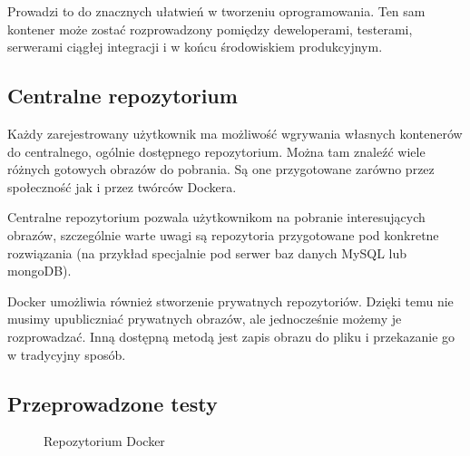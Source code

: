 \par{Prowadzi to do znacznych ułatwień w tworzeniu oprogramowania. Ten sam kontener może zostać rozprowadzony pomiędzy deweloperami, testerami, serwerami ciągłej integracji i w końcu środowiskiem produkcyjnym. }

\subsection[Centralne repozytorium]{Centralne repozytorium}

\par{Każdy zarejestrowany użytkownik ma możliwość wgrywania własnych kontenerów do centralnego, ogólnie dostępnego repozytorium. Można tam znaleźć wiele różnych gotowych obrazów do pobrania. Są one przygotowane zarówno przez społeczność jak i przez twórców Dockera. }

\par{Centralne repozytorium pozwala użytkownikom na pobranie interesujących obrazów, szczególnie warte uwagi są repozytoria przygotowane pod konkretne rozwiązania (na przykład specjalnie pod serwer baz danych MySQL lub mongoDB). }

\par{Docker umożliwia również stworzenie prywatnych repozytoriów. Dzięki temu nie musimy upubliczniać prywatnych obrazów, ale jednocześnie możemy je rozprowadzać. Inną dostępną metodą jest zapis obrazu do pliku i przekazanie go w tradycyjny sposób. }

\subsection[Przeprowadzone testy]{Przeprowadzone testy}

\begin{figure}[h!tb]
\centering
{}
\caption{Repozytorium Docker}
\label{img:docker_tut1}
\end{figure}

